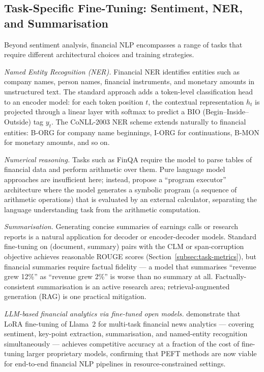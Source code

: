 \begin{context}
\subsection{Task-Specific Fine-Tuning: Sentiment, NER, and Summarisation}
\label{subsec:task-finetuning}

Beyond sentiment analysis, financial NLP encompasses a range of tasks that
require different architectural choices and training strategies.

\emph{Named Entity Recognition (NER).}  Financial NER identifies entities
such as company names, person names, financial instruments, and monetary
amounts in unstructured text.  The standard approach adds a token-level
classification head to an encoder model: for each token position $t$, the
contextual representation $h_t$ is projected through a linear layer with
softmax to predict a BIO (Begin--Inside--Outside) tag $y_t$.
The CoNLL-2003 NER scheme extends naturally
to financial entities: B-ORG for company name beginnings, I-ORG for continuations,
B-MON for monetary amounts, and so on.

\emph{Numerical reasoning.}  Tasks such as FinQA require the model to parse
tables of financial data and perform arithmetic over them.  Pure language model
approaches are insufficient here; instead, \citet{chen2021finqa} propose a
``program executor'' architecture where the model generates a symbolic program
(a sequence of arithmetic operations) that is evaluated by an external calculator,
separating the language understanding task from the arithmetic computation.

\emph{Summarisation.}  Generating concise summaries of earnings calls or
research reports is a natural application for decoder or encoder-decoder models.
Standard fine-tuning on (document, summary) pairs with the CLM or span-corruption
objective achieves reasonable ROUGE scores (Section~\ref{subsec:task-metrics}),
but financial summaries require factual fidelity --- a model that summarises
``revenue grew 12\%'' as ``revenue grew 2\%'' is worse than no summary at all.
Factually-consistent summarisation is an active research area; retrieval-augmented
generation (RAG) is one practical mitigation.

\emph{LLM-based financial analytics via fine-tuned open models.}
\citet{zhang2023finllamallora} demonstrate that LoRA fine-tuning of
Llama~2 for multi-task financial news analytics --- covering sentiment, key-point
extraction, summarisation, and named-entity recognition simultaneously --- achieves
competitive accuracy at a fraction of the cost of fine-tuning larger proprietary
models, confirming that PEFT methods are now viable for end-to-end financial NLP
pipelines in resource-constrained settings.

\end{context}

